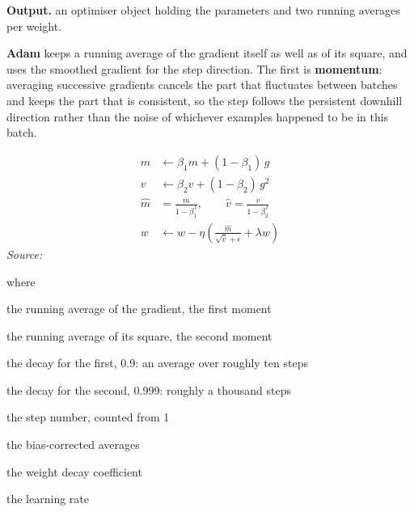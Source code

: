 \noindent\textbf{Output.} an optimiser object holding the parameters and two running averages per weight.


\textbf{Adam} \cite{kingma2015} keeps a running average of the gradient itself as well as of its square, and uses the smoothed gradient for the step direction. The first is \textbf{momentum}: averaging successive gradients cancels the part that fluctuates between batches and keeps the part that is consistent, so the step follows the persistent downhill direction rather than the noise of whichever examples happened to be in this batch.


\begin{equation}
\begin{aligned} m &\leftarrow \beta_1 m + (1-\beta_1)\,g \\[2pt] v &\leftarrow \beta_2 v + (1-\beta_2)\,g^2 \\[2pt] \hat{m} &= \frac{m}{1-\beta_1^{\,t}}, \qquad \hat{v} = \frac{v}{1-\beta_2^{\,t}} \\[2pt] w &\leftarrow w - \eta\left(\frac{\hat{m}}{\sqrt{\hat{v}}+\epsilon} + \lambda w\right) \end{aligned}
\end{equation}
\noindent\emph{Source: }\cite{kingma2015}


\noindent where
\begin{description}[leftmargin=2.4em,style=nextline,font=\normalfont\ttfamily]\setlength\itemsep{1pt}
  \item[{$m$}] \normalfont the running average of the gradient, the first moment
  \item[{$v$}] \normalfont the running average of its square, the second moment
  \item[{$\beta_1$}] \normalfont the decay for the first, 0.9: an average over roughly ten steps
  \item[{$\beta_2$}] \normalfont the decay for the second, 0.999: roughly a thousand steps
  \item[{$t$}] \normalfont the step number, counted from 1
  \item[{$\hat{m},\,\hat{v}$}] \normalfont the bias-corrected averages
  \item[{$\lambda$}] \normalfont the weight decay coefficient
  \item[{$\eta$}] \normalfont the learning rate
\end{description}


